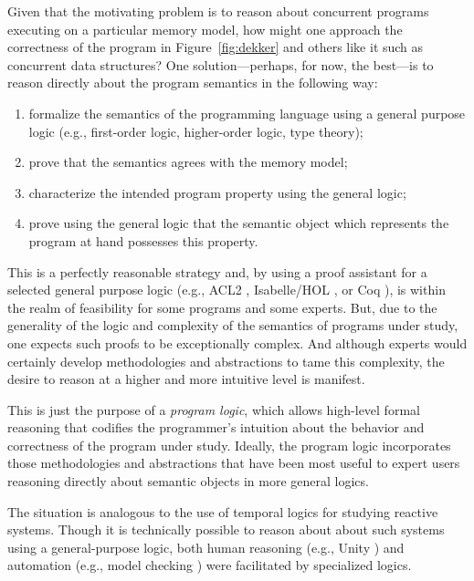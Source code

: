 \documentclass[11pt]{report}
\begin{document}
Given that the motivating problem is to reason about concurrent programs executing on a particular memory model, how might one approach the correctness of the program in Figure~\ref{fig:dekker} and others like it such as concurrent data structures? One solution---perhaps, for now, the best---is to reason directly about the program semantics in the following way:
\begin{enumerate}
\item formalize the semantics of the programming language using a general purpose logic (e.g., first-order logic, higher-order logic, type theory);

\item prove that the semantics agrees with the memory model;

\item characterize the intended program property using the general logic; 

\item prove using the general logic that the semantic object which represents the program at hand possesses this property.
\end{enumerate} 
This is a perfectly reasonable strategy and, by using a proof assistant for a selected general purpose logic (e.g., ACL2 \cite{DBLP:journals/tse/KaufmannM97}, Isabelle/HOL \cite{DBLP:books/sp/NipkowPW02}, or Coq \cite{CoqBook}), is within the realm of feasibility for some programs and some experts. But, due to the generality of the logic and complexity of the semantics of programs under study, one expects such proofs to be exceptionally complex. And although experts would certainly develop methodologies and abstractions to tame this complexity, the desire to reason at a higher and more intuitive level is manifest.

This is just the purpose of a \emph{program logic}, which allows high-level formal reasoning that codifies the programmer's intuition about the behavior and correctness of the program under study. Ideally, the program logic incorporates those methodologies and abstractions that have been most useful to expert users reasoning directly about semantic objects in more general logics.

The situation is analogous to the use of temporal logics for studying reactive systems. Though it is technically possible to reason about about such systems using a general-purpose logic, both human reasoning (e.g., Unity \cite{unity-book}) and automation (e.g., model checking \cite{model-checking}) were facilitated by specialized logics.
\end{document}
